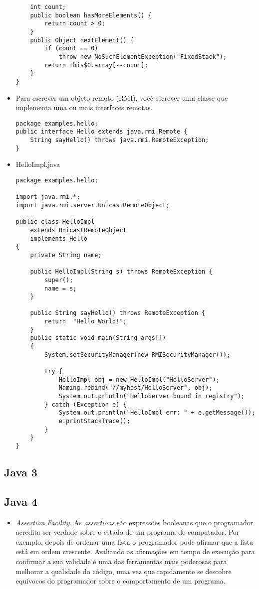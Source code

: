 \begin{itemize}
\begin{verbatim}
    int count;
    public boolean hasMoreElements() {
        return count > 0;
    }
    public Object nextElement() {
        if (count == 0)
            throw new NoSuchElementException("FixedStack");
        return this$0.array[--count];
    }
}\end{verbatim}
  \item Para escrever um objeto remoto (RMI), você escrever uma classe que implementa uma ou mais interfaces remotas. 
  \begin{verbatim}
package examples.hello;
public interface Hello extends java.rmi.Remote {
	String sayHello() throws java.rmi.RemoteException;
}
  \end{verbatim}
  \item HelloImpl.java
  \begin{verbatim}
package examples.hello;

import java.rmi.*;
import java.rmi.server.UnicastRemoteObject;

public class HelloImpl
	extends UnicastRemoteObject
	implements Hello
{
	private String name;

	public HelloImpl(String s) throws RemoteException {
		super();
		name = s;
	}

	public String sayHello() throws RemoteException {
		return  "Hello World!";
	}
	public static void main(String args[])
	{
		System.setSecurityManager(new RMISecurityManager());

		try {
			HelloImpl obj = new HelloImpl("HelloServer");
			Naming.rebind("//myhost/HelloServer", obj);
			System.out.println("HelloServer bound in registry");
		} catch (Exception e) {
			System.out.println("HelloImpl err: " + e.getMessage());
			e.printStackTrace();
		}
	}
}
  \end{verbatim}
\end{itemize}
\subsection {Java 3}
\subsection {Java 4}
  \begin{itemize}
  \item {\it Assertion Facility}. As {\it assertions} são expressões booleanas que o programador acredita ser verdade sobre o estado de um programa de computador. Por exemplo, depois de ordenar uma lista o programador pode afirmar que a lista está em ordem crescente. Avaliando as afirmações em tempo de execução para confirmar a sua validade é uma das ferramentas mais poderosas para melhorar a qualidade do código, uma vez que rapidamente se descobre equívocos do programador sobre o comportamento de um programa.
  \end{itemize}
